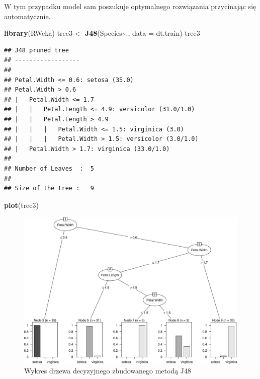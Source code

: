 \documentclass[
]{book}
\newenvironment{Shaded}{\begin{snugshade}}{\end{snugshade}}
\newcommand{\AttributeTok}[1]{\textcolor[rgb]{0.13,0.29,0.53}{#1}}
\newcommand{\FunctionTok}[1]{\textcolor[rgb]{0.13,0.29,0.53}{\textbf{#1}}}
\newcommand{\NormalTok}[1]{#1}
\newcommand{\OtherTok}[1]{\textcolor[rgb]{0.56,0.35,0.01}{#1}}
\newcommand{\SpecialCharTok}[1]{\textcolor[rgb]{0.81,0.36,0.00}{\textbf{#1}}}
\theoremstyle{plain}
\theoremstyle{definition}
\theoremstyle{definition}
\theoremstyle{definition}
\theoremstyle{definition}
\theoremstyle{definition}
\theoremstyle{remark}
\begin{document}
W tym przypadku model sam poszukuje optymalnego rozwiązania przycinając się automatycznie.

\begin{Shaded}
\begin{Highlighting}[]
\FunctionTok{library}\NormalTok{(RWeka)}
\NormalTok{tree3 }\OtherTok{\textless{}{-}} \FunctionTok{J48}\NormalTok{(Species}\SpecialCharTok{\textasciitilde{}}\NormalTok{., }\AttributeTok{data =}\NormalTok{ dt.train)}
\NormalTok{tree3}
\end{Highlighting}
\end{Shaded}

\begin{verbatim}
## J48 pruned tree
## ------------------
## 
## Petal.Width <= 0.6: setosa (35.0)
## Petal.Width > 0.6
## |   Petal.Width <= 1.7
## |   |   Petal.Length <= 4.9: versicolor (31.0/1.0)
## |   |   Petal.Length > 4.9
## |   |   |   Petal.Width <= 1.5: virginica (3.0)
## |   |   |   Petal.Width > 1.5: versicolor (3.0/1.0)
## |   Petal.Width > 1.7: virginica (33.0/1.0)
## 
## Number of Leaves  :  5
## 
## Size of the tree :   9
\end{verbatim}

\begin{Shaded}
\begin{Highlighting}[]
\FunctionTok{plot}\NormalTok{(tree3)}
\end{Highlighting}
\end{Shaded}

\begin{figure}
\centering
\includegraphics{EksploracjaDanych_files/figure-latex/J48-1.pdf}
\caption{\label{fig:J48}Wykres drzewa decyzyjnego zbudowanego metodą J48}
\end{figure}
\end{document}
